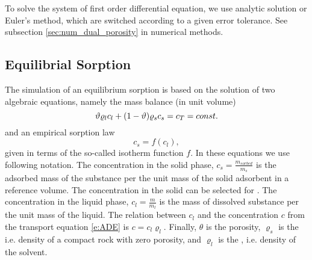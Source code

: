 To solve the system of first order differential equation, we use analytic solution or Euler's method,
which are switched according to a given error tolerance. See subsection \ref{sec:num_dual_porosity} 
in numerical methods.
 

\subsection{Equilibrial Sorption}
\label{sec:sorp_math}

The simulation of an equilibrium sorption is based on the solution of two algebraic equations, namely the mass balance (in unit volume)
\begin{equation}
\label{eq:mass_balance_sorption}
\th \varrho_l c_l + (1-\th) \varrho_s c_s = c_T = const.
\end{equation}
and an empirical sorption law
\begin{equation}
\label{eq:relation_cs_cl}
c_s = f(c_l),
\end{equation}
given in terms of the so-called isotherm function $f$.  In these equations we use following notation. 
The concentration in the solid phase, $c_s = \frac{m_{sorbed}}{m_s}$ \units{}{}{} is the adsorbed mass of the substance
per the unit mass of the solid adsorbent in a reference volume. The concentration
in the solid can be selected for .
The concentration in the liquid phase, $c_l = \frac{m}{m_l}$ \units{}{}{} is the mass of dissolved substance
per the unit mass of the liquid. The relation between $c_l$ and the concentration $c$ from 
       the transport equation \eqref{e:ADE} is $c = c_l \varrho_l$.
 Finally, $\theta$ is the porosity, $\varrho_s$ is the  i.e. density of a compact rock with zero porosity,
 and $\varrho_l$ is the , i.e. density of the solvent.



